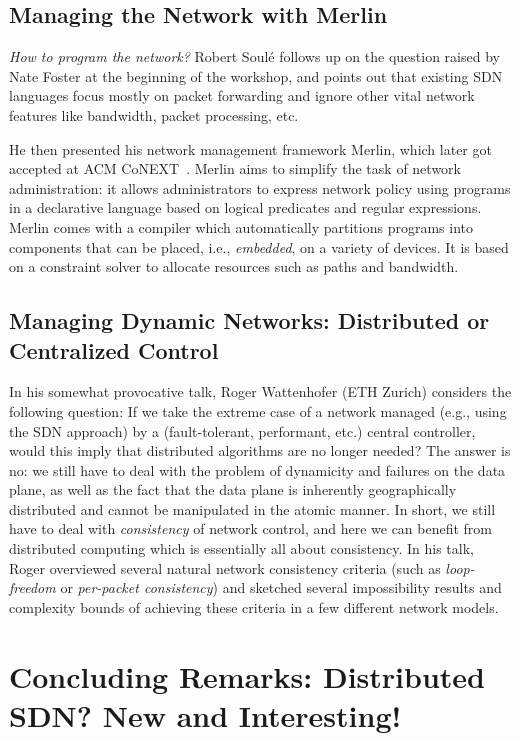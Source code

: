 \documentclass[11pt,pdftex,letter]{article}
\begin{document}
\subsection{Managing the Network with Merlin}

\emph{How to program the network?} Robert Soul\'{e} follows up on the question raised by Nate Foster
at the beginning of the workshop, and points out that
existing SDN languages focus mostly
on packet forwarding and
ignore other vital network features like
bandwidth, packet processing, etc.

He then presented his network management framework Merlin, which later got
accepted at ACM CoNEXT~\cite{merlin}. Merlin aims to
simplify the task of network administration: it
allows administrators to express network policy using programs in a declarative language based on logical predicates and regular expressions.
Merlin comes with a compiler which automatically partitions programs into components that can be placed, i.e., \emph{embedded}, on a variety of devices.
It is based on a constraint solver to allocate resources such as paths and bandwidth. 

\subsection{Managing Dynamic Networks: Distributed or Centralized
  Control}

In his somewhat provocative talk, Roger Wattenhofer (ETH Zurich) considers
the following question: If we take the extreme case of a network
managed (e.g., using the SDN approach) by a (fault-tolerant,
performant, etc.) central controller, would this imply
that distributed algorithms are no longer needed? The answer is no: we still have to deal with the problem of
dynamicity and failures on the data plane, as well as the fact that
the data plane is inherently geographically distributed and cannot be
manipulated in the atomic manner. In short, we still have to deal with
\emph{consistency} of network control, and here we can benefit from
distributed computing which is essentially all about consistency.
In his talk, Roger overviewed several natural network consistency
criteria (such as \emph{loop-freedom} or \emph{per-packet
  consistency}) and sketched several impossibility results and
complexity bounds of achieving these criteria in a few different
network models.


\section{Concluding Remarks: Distributed SDN? New and Interesting!}
\end{document}

